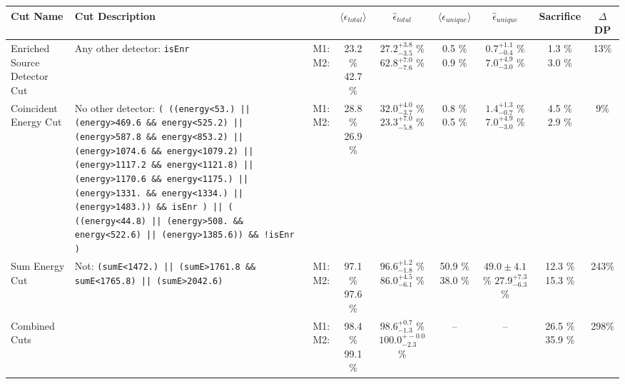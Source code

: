 \small
\begin{tabular}{|>{\raggedright}m{3cm}|m{6cm}|c c c|c c|c|c|}
\hline
  Cut Name & Cut Description &   & $\langle\epsilon_{total}\rangle$ & $\hat{\epsilon}_{total}$ & $\langle\epsilon_{unique}\rangle$ & $\hat{\epsilon}_{unique}$ & Sacrifice & $\Delta$DP \\
\hline
  Enriched Source Detector Cut & \tiny Any other detector: \texttt{isEnr} & \makecell{M1: \\ M2:} & \makecell{23.2 \% \\ 42.7 \%} & \makecell{$27.2^{+3.8}_{-3.5}$ \% \\ $62.8^{+7.0}_{-7.6}$ \%} & \makecell{0.5 \% \\ 0.9 \%} & \makecell{$0.7^{+1.1}_{-0.4}$ \% \\ $7.0^{+4.9}_{-3.0}$ \%} & \makecell{1.3 \% \\ 3.0 \%} & 13\% \\
  Coincident Energy Cut & \tiny No other detector: \texttt{( ((energy<53.) || (energy>469.6 \&\& energy<525.2) || (energy>587.8 \&\& energy<853.2) || (energy>1074.6 \&\& energy<1079.2) || (energy>1117.2 \&\& energy<1121.8) || (energy>1170.6 \&\& energy<1175.) || (energy>1331. \&\& energy<1334.) || (energy>1483.)) \&\& isEnr ) || ( ((energy<44.8) || (energy>508. \&\& energy<522.6) || (energy>1385.6)) \&\& !isEnr )} & \makecell{M1: \\ M2:} & \makecell{28.8 \% \\ 26.9 \%} & \makecell{$32.0^{+4.0}_{-3.7}$ \% \\ $23.3^{+7.0}_{-5.8}$ \%} & \makecell{0.8 \% \\ 0.5 \%} & \makecell{$1.4^{+1.3}_{-0.7}$ \% \\ $7.0^{+4.9}_{-3.0}$ \%} & \makecell{4.5 \% \\ 2.9 \%} & 9\% \\
  Sum Energy Cut & \tiny Not:  \texttt{(sumE<1472.) || (sumE>1761.8 \&\& sumE<1765.8) || (sumE>2042.6)} & \makecell{M1: \\ M2:} & \makecell{97.1 \% \\ 97.6 \%} & \makecell{$96.6^{+1.2}_{-1.8}$ \% \\ $86.0^{+4.5}_{-6.1}$ \%} & \makecell{50.9 \% \\ 38.0 \%} & \makecell{$49.0 \pm 4.1$ \% \\ $27.9^{+7.3}_{-6.3}$ \%} & \makecell{12.3 \% \\ 15.3 \%} & 243\% \\
  Combined Cuts &  & \makecell{M1: \\ M2:} & \makecell{98.4 \% \\ 99.1 \%} & \makecell{$98.6^{+0.7}_{-1.3}$ \% \\ $100.0^{+-0.0}_{-2.3}$ \%} & -- & -- & \makecell{26.5 \% \\ 35.9 \%} & 298\% \\
\hline
\end{tabular}
